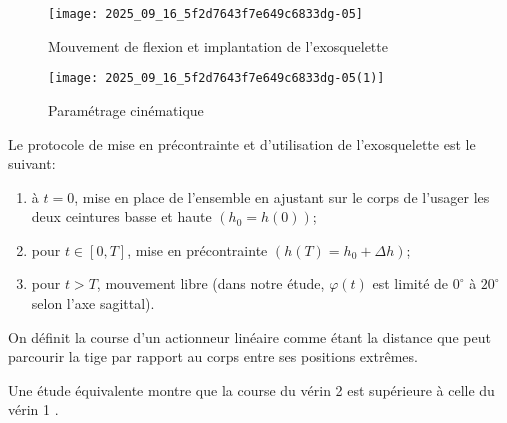\begin{figure}[!h]
\centering
\texttt{[image: 2025\_09\_16\_5f2d7643f7e649c6833dg-05]}
\caption{\label{ccs_mp_2023_fig_06}  Mouvement de flexion et implantation de l'exosquelette}
\end{figure}





\begin{figure}[!h]
\centering
\texttt{[image: 2025\_09\_16\_5f2d7643f7e649c6833dg-05(1)]}
\caption{\label{ccs_mp_2023_fig_07} Paramétrage cinématique }
\end{figure}




Le protocole de mise en précontrainte et d'utilisation de l'exosquelette est le suivant:

\begin{enumerate}
  \item à $t=0$, mise en place de l'ensemble en ajustant sur le corps de l'usager les deux ceintures basse et haute $\left(h_{0}=h(0)\right)$;
  \item pour $t \in[0, T]$, mise en précontrainte $\left(h(T)=h_{0}+\Delta h\right)$;
  \item pour $t>T$, mouvement libre (dans notre étude, $\varphi(t)$ est limité de $0^{\circ}$ à $20^{\circ}$ selon l'axe sagittal).
\end{enumerate}

On définit la course d'un actionneur linéaire comme étant la distance que peut parcourir la tige par rapport au corps entre ses positions extrêmes.\\

\ifprof
\begin{corrige}
\end{corrige}
\else
\fi


Une étude équivalente montre que la course du vérin 2 est supérieure à celle du vérin 1 .

